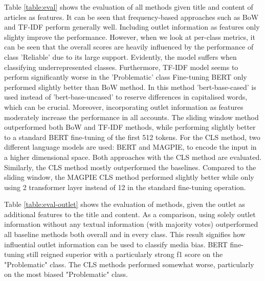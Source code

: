 Table \ref{table:eval} shows the evaluation of all methods given title and content of articles as features. It can be seen that frequency-based approaches such as BoW and TF-IDF perform generally well. Including outlet information as features only slighty improve the performance. However, when we look at per-class metrics, it can be seen that the overall scores are heavily influenced by the performance of class 'Reliable' due to its large support. Evidently, the model suffers when classifying underrepresented classes. Furthermore, TF-IDF model seems to perform significantly worse in the 'Problematic' class Fine-tuning BERT only performed slightly better than BoW method. In this method 'bert-base-cased' is used instead of 'bert-base-uncased' to reserve differences in capitalised words, which can be crucial. Moreover, incorporating outlet information as features moderately increase the performance in all accounts. The sliding window method outperformed both BoW and TF-IDF methods, while performing slightly better to a standard BERT fine-tuning of the first 512 tokens. For the CLS method, two different language models are used: BERT and MAGPIE, to encode the input in a higher dimensional space. Both approaches with the CLS method are evaluated. Similarly, the CLS method mostly outperformed the baselines. Compared to the sliding window, the MAGPIE CLS method performed slightly better while only using 2 transformer layer instead of 12 in the standard fine-tuning operation.

Table \ref{table:eval-outlet} shows the evaluation of methods, given the outlet as additional features to the title and content. As a comparison, using solely outlet information without any textual information (with majority votes) outperformed all baseline methods both overall and in every class. This result signifies how influential outlet information can be used to classify media bias. BERT fine-tuning still reigned superior with a particularly strong f1 score on the "Problematic" class. The CLS methods performed somewhat worse, particularly on the most biased "Problematic" class.


